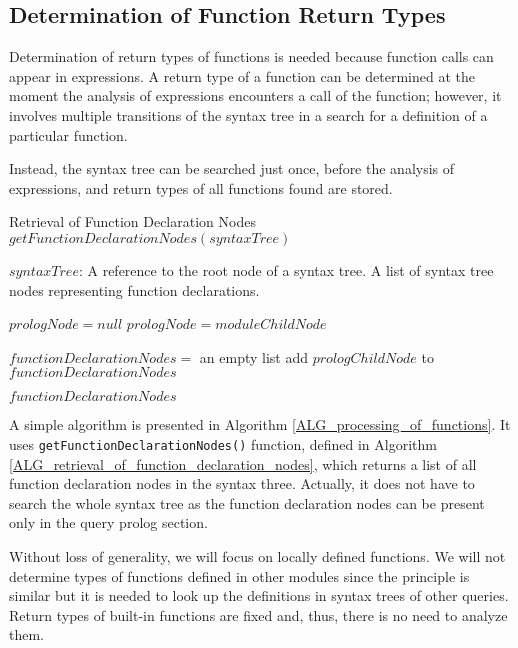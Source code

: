 \subsection{Determination of Function Return Types}
Determination of return types of functions is needed because function calls can appear in expressions. A return type of a function can be determined at the moment the analysis of expressions encounters a call of the function; however, it involves multiple transitions of the syntax tree in a search for a definition of a particular function.

Instead, the syntax tree can be searched just once, before the analysis of expressions, and return types of all functions found are stored.

\begin{algorithm}
\caption{Retrieval of Function Declaration Nodes $getFunctionDeclarationNodes(syntaxTree)$}
\label{ALG_retrieval_of_function_declaration_nodes}
\begin{algorithmic}[1]
\REQUIRE $syntaxTree$: A reference to the root node of a syntax tree.
\ENSURE A list of syntax tree nodes representing function declarations.

\STATE $prologNode = null$
        \STATE $prologNode = moduleChildNode$
    \ENDIF
\ENDFOR

\STATE $functionDeclarationNodes =$ an empty list
            \STATE add $prologChildNode$ to $functionDeclarationNodes$
        \ENDIF
    \ENDFOR
\ENDIF

\RETURN $functionDeclarationNodes$
\end{algorithmic}
\end{algorithm}

A simple algorithm is presented in Algorithm \ref{ALG_processing_of_functions}. It uses \texttt{getFunction\-DeclarationNodes()} function, defined in Algorithm \ref{ALG_retrieval_of_function_declaration_nodes}, which returns a list of all function declaration nodes in the syntax three. Actually, it does not have to search the whole syntax tree as the function declaration nodes can be present only in the query prolog section. 

Without loss of generality, we will focus on locally defined functions. We will not determine types of functions defined in other modules since the principle is similar but it is needed to look up the definitions in syntax trees of other queries. Return types of built-in functions are fixed and, thus, there is no need to analyze them.

